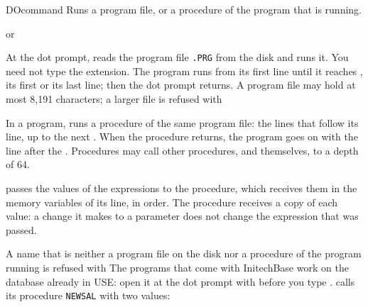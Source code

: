 \begin{XbaseEntry}{DO}{command}
Runs a program file, or a procedure of the program that is running.
\Syntax
{}
\par or\par
{}
\Usage
At the dot prompt,   reads the program file
\texttt{.PRG} from the disk and runs it.  You need not type the
extension.  The program runs from its first line until it reaches
, its first  or its last line; then the dot prompt
returns.  A program file may hold at most 8,191 characters; a larger file is
refused with 

In a program,   runs a procedure of the same program
file: the lines that follow its  line, up to the next
.  When the procedure returns, the program goes on with the line
after the .  Procedures may call other procedures, and themselves, to a
depth of 64.

 passes the values of the expressions to the procedure, which
receives them in the memory variables of its  line, in order.
The procedure receives a copy of each value: a change it makes to a parameter
does not change the expression that was passed.

A name that is neither a program file on the disk nor a procedure of the
program running is refused with 
\Tips
The programs that come with InitechBase work on the database already in USE:
open it at the dot prompt with  before you type .
\Examples
{} calls its procedure \texttt{NEWSAL} with two values:
\end{XbaseEntry}

